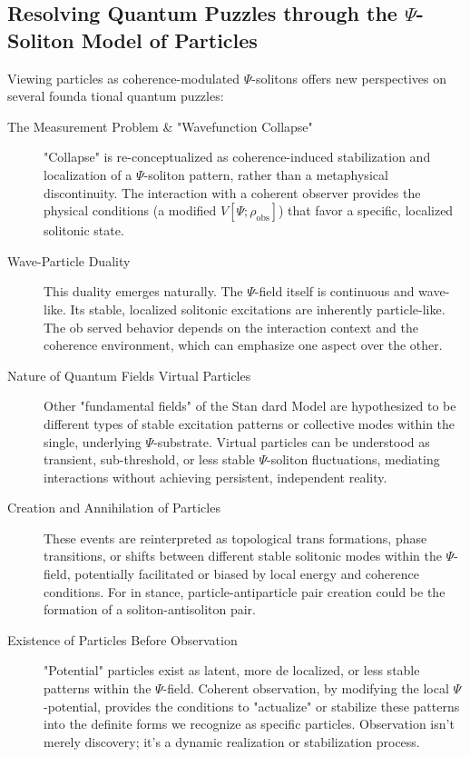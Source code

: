 \documentclass{report}
\begin{document}
    \subsection{Resolving Quantum Puzzles through the $\Psi$-Soliton Model of Particles}
    \label{subsec:resolving_puzzles_psi_soliton}
    Viewing particles as coherence-modulated $\Psi$-solitons offers new perspectives on several founda tional quantum puzzles:
    \begin{description}
        \item[The Measurement Problem \& "Wavefunction Collapse"] "Collapse" is re-conceptualized as coherence-induced stabilization and localization of a $\Psi$-soliton pattern, rather than a metaphysical discontinuity. The interaction with a coherent observer provides the physical conditions (a modified $V[\Psi; \rho_{\text{obs}}]$) that favor a specific, localized solitonic state.
        \item[Wave-Particle Duality] This duality emerges naturally. The $\Psi$-field itself is continuous and wave-like. Its stable, localized solitonic excitations are inherently particle-like. The ob served behavior depends on the interaction context and the coherence environment, which can emphasize one aspect over the other.
        \item[Nature of Quantum Fields Virtual Particles] Other "fundamental fields" of the Stan dard Model are hypothesized to be different types of stable excitation patterns or collective modes within the single, underlying $\Psi$-substrate. Virtual particles can be understood as transient, sub-threshold, or less stable $\Psi$-soliton fluctuations, mediating interactions without achieving persistent, independent reality.
        \item[Creation and Annihilation of Particles] These events are reinterpreted as topological trans formations, phase transitions, or shifts between different stable solitonic modes within the $\Psi$-field, potentially facilitated or biased by local energy and coherence conditions. For in stance, particle-antiparticle pair creation could be the formation of a soliton-antisoliton pair.
        \item[Existence of Particles Before Observation] "Potential" particles exist as latent, more de localized, or less stable patterns within the $\Psi$-field. Coherent observation, by modifying the local $\Psi$-potential, provides the conditions to "actualize" or stabilize these patterns into the definite forms we recognize as specific particles. Observation isn’t merely discovery; it’s a dynamic realization or stabilization process.
    \end{description}
\end{document}
